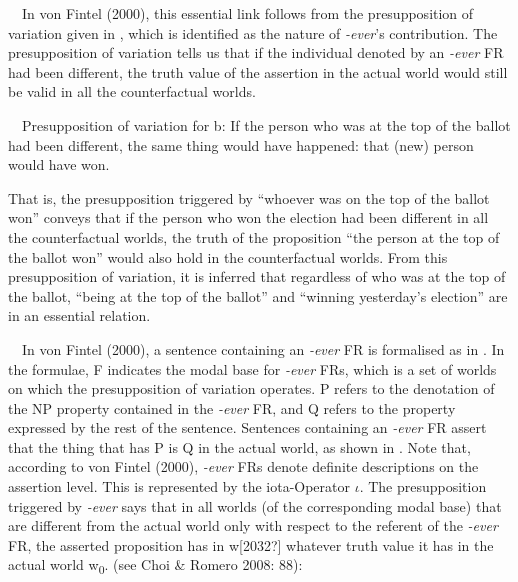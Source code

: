 \begin{styleStandard}
\ \ In von Fintel (2000), this essential link follows from the presupposition of variation given in , which is identified as the nature of \textit{\nobreakdash-ever}’s contribution. The presupposition of variation tells us that if the individual denoted by an \textit{\nobreakdash-ever} FR had been different, the truth value of the assertion in the actual world would still be valid in all the counterfactual worlds.
\end{styleStandard}

\begin{styleStandard}
\label{bkm:Ref533762335}\ \ Presupposition of variation for b: If the person who was at the top of the ballot had been different, the same thing would have happened: that (new) person would have won.
\end{styleStandard}

\begin{styleStandard}
That is, the presupposition triggered by “whoever was on the top of the ballot won”\textit{ }conveys that if the person who won the election had been different in all the counterfactual worlds, the truth of the proposition “the person at the top of the ballot won” would also hold in the counterfactual worlds. From this presupposition of variation, it is inferred that regardless of who was at the top of the ballot, “being at the top of the ballot” and “winning yesterday’s election” are in an essential relation.
\end{styleStandard}

\begin{styleStandard}
\ \ In von Fintel (2000), a sentence containing an \textit{\nobreakdash-ever} FR is formalised as in . In the formulae, F indicates the modal base for \textit{\nobreakdash-ever} FRs, which is a set of worlds on which the presupposition of variation operates. P refers to the denotation of the NP property contained in the \textit{\nobreakdash-ever} FR, and Q refers to the property expressed by the rest of the sentence. Sentences containing an \textit{\nobreakdash-ever} FR assert that the thing that has P is Q in the actual world, as shown in . Note that, according to von Fintel (2000), \textit{{}-ever} FRs denote definite descriptions on the assertion level. This is represented by the iota-Operator $\iota $. The presupposition triggered by \textit{\nobreakdash-ever} says that in all worlds (of the corresponding modal base) that are different from the actual world only with respect to the referent of the \textit{\nobreakdash-ever} FR, the asserted proposition has in w[2032?] whatever truth value it has in the actual world w\textsubscript{0}. (see Choi \& Romero 2008: 88):
\end{styleStandard}

